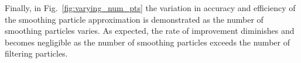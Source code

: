 \documentclass[10pt,twocolumn,twoside]{IEEEtran}
\begin{document}
%
%
%
%
Finally, in Fig.~\ref{fig:varying_num_pts} the variation in accuracy and efficiency of the smoothing particle approximation is demonstrated as the number of smoothing particles varies. As expected, the rate of improvement diminishes and becomes negligible as the number of smoothing particles exceeds the number of filtering particles.
%
\end{document}
